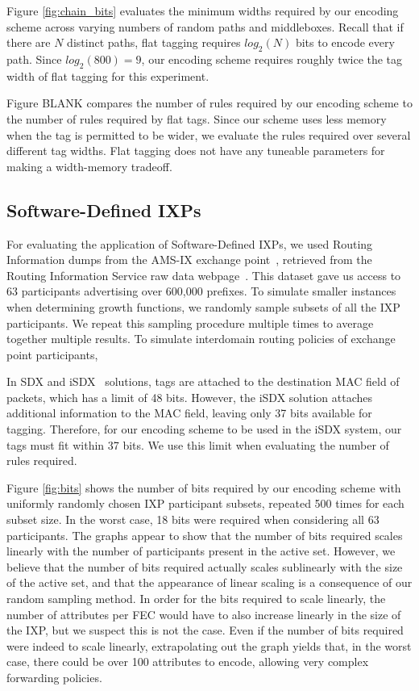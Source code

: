 Figure \ref{fig:chain_bits} evaluates the minimum widths required by our encoding scheme across varying numbers of random paths and middleboxes. Recall that if there are $N$ distinct paths, flat tagging requires $log_2(N)$ bits to encode every path. Since $log_2(800) = 9$, our encoding scheme requires roughly twice the tag width of flat tagging for this experiment. 

Figure BLANK compares the number of rules required by our encoding scheme to the number of rules required by flat tags. Since our scheme uses less memory when the tag is permitted to be wider, we evaluate the rules required over several different tag widths. Flat tagging does not have any tuneable parameters for making a width-memory tradeoff. 





\subsection{Software-Defined IXPs}
For evaluating the application of Software-Defined IXPs, we used Routing Information dumps from the AMS-IX exchange point~\cite{ams-ix}, retrieved from the Routing Information Service raw data webpage~\cite{ris}. This dataset gave us access to 63 participants advertising over 600,000 prefixes. 
To simulate smaller instances when determining growth functions, we randomly sample subsets of all the IXP participants. We repeat this sampling procedure multiple times to average together multiple results. To simulate interdomain routing policies of exchange point participants, 

In SDX and iSDX~\cite{sdx, isdx} solutions, tags are attached to the destination MAC field of packets, which has a limit of 48 bits. However, the iSDX solution attaches additional information to the MAC field, leaving only 37 bits available for tagging. Therefore, for our encoding scheme to be used in the iSDX system, our tags must fit within 37 bits. We use this limit when evaluating the number of rules required. 

Figure \ref{fig:bits} shows the number of bits required by our encoding scheme with uniformly randomly chosen IXP participant subsets, repeated 500 times for each subset size. In the worst case, 18 bits were required when considering all 63 participants. The graphs appear to show that the number of bits required scales linearly with the number of participants present in the active set. However, we believe that the number of bits required actually scales sublinearly with the size of the active set, and that the appearance of linear scaling is a consequence of our random sampling method. In order for the bits required to scale linearly, the number of attributes per FEC would have to also increase linearly in the size of the IXP, but we suspect this is not the case. Even if the number of bits required were indeed to scale linearly, extrapolating out the graph yields that, in the worst case, there could be over 100 attributes to encode, allowing very complex forwarding policies.

